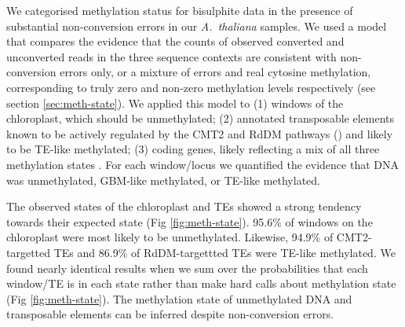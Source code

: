 \documentclass[twocolumn,twoside,lettersize]{article}
\begin{document}
We categorised methylation status for bisulphite data in the presence of substantial non-conversion errors in our \emph{A.~thaliana} samples.
We used a model that compares the evidence that the counts of observed converted and unconverted reads in the three sequence contexts are consistent with non-conversion errors only, or a mixture of errors and real cytosine methylation, corresponding to truly zero and non-zero methylation levels respectively (see section \ref{sec:meth-state}).
We applied this model to (1) windows of the chloroplast, which should be unmethylated; (2) annotated transposable elements known to be actively regulated by the CMT2 and RdDM pathways (\cite{stroud2013comprehensive}) and likely to be TE-like methylated; (3) coding genes, likely reflecting a mix of all three methylation states \parencite{zhang2020natural}.
For each window/locus we quantified the evidence that DNA was unmethylated, GBM-like methylated, or TE-like methylated.

The observed states of the chloroplast and TEs showed a strong tendency towards their expected state (Fig \ref{fig:meth-state}).
95.6\% of windows on the chloroplast were most likely to be unmethylated.
Likewise, 94.9\% of CMT2-targetted TEs and 86.9\% of RdDM-targettted TEs were TE-like methylated.
We found nearly identical results when we sum over the probabilities that each window/TE is in each state rather than make hard calls about methylation state (Fig \ref{fig:meth-state}).
The methylation state of unmethylated DNA and transposable elements can be inferred despite non-conversion errors.
\end{document}
